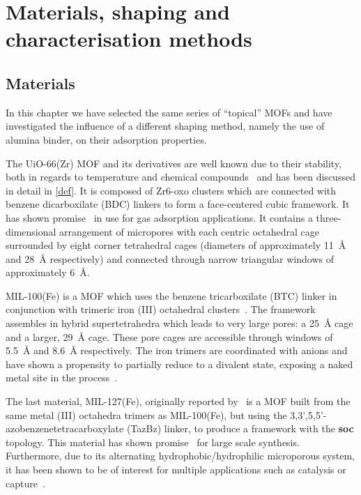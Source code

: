 
\section{Materials, shaping and characterisation methods}

\subsection{Materials}

In this chapter we have selected the same series of ``topical'' MOFs and 
have investigated the influence of a different shaping method, namely 
the use of alumina binder, on their adsorption properties.

The UiO-66(Zr) MOF and its derivatives are well known due to their 
stability, both in regards to temperature and chemical 
compounds~\cite{cavkaNewZirconiumInorganic2008} and has been 
discussed in detail in \autoref{def}. It is composed of
Zr6-oxo clusters which are connected with benzene dicarboxilate 
(BDC) linkers to form a face-centered cubic framework. It has
shown promise~\cite{wiersumEvaluationUiO66GasBased2011}
in use for gas adsorption applications. It contains a 
three-dimensional arrangement of micropores with each centric
octahedral cage surrounded by eight corner tetrahedral cages 
(diameters of approximately \SI{11}{\angstrom} and \SI{28}{\angstrom} 
respectively) and connected through narrow triangular windows 
of approximately \SI{6}{\angstrom}.

MIL-100(Fe) is a MOF which uses the benzene tricarboxilate (BTC) linker 
in conjunction with trimeric iron (III) octahedral 
clusters~\cite{horcajadaSynthesisCatalyticProperties2007,%
YangWaterStableMetalOrganic2013}.
The framework assembles in hybrid supertetrahedra which leads to very 
large pores: a \SI{25}{\angstrom} cage and a larger, \SI{29}{\angstrom}
cage. These pore cages are accessible through windows of 
\SI{5.5}{\angstrom} and \SI{8.6}{\angstrom} respectively.
The iron trimers are coordinated with
anions and have shown a propensity to partially reduce to a divalent 
 state, exposing a naked metal site in the
process~\cite{yoonControlledReducibilityMetalOrganic2010}.

The last material, MIL-127(Fe), originally reported 
by~\citeauthor{liuAssemblyMetalOrganic2007} is a MOF built from the same
metal (III) octahedra trimers as MIL-100(Fe), but using the
3,3',5,5'-azobenzenetetracarboxylate (TazBz) linker, to produce a 
framework with the \textbf{soc} topology. This material has shown 
promise~\cite{chevreauSynthesisBiocompatibleHighly2016}
for large scale synthesis. Furthermore, due to its alternating
hydrophobic/hydrophilic microporous system, it has been shown to be
of interest for multiple applications such as catalysis or 
 capture~\cite{chanutScreeningEffectWater2017}.


